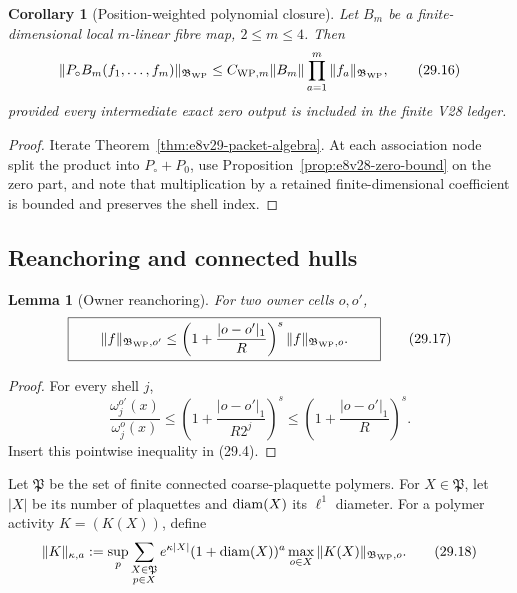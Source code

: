 \documentclass[11pt,oneside]{book}
\newtheorem{lemma}[theorem]{Lemma}
\newtheorem{corollary}[theorem]{Corollary}
\theoremstyle{definition}
\theoremstyle{remark}
\begin{document}
\begin{corollary}[Position-weighted polynomial closure]
\label{cor:e8v29-polynomial}
Let \(B_m\) be a finite-dimensional local \(m\)-linear fibre map,
\(2\leq m\leq4\).  Then
\[
 \|P_\circ B_m(f_1,\ldots,f_m)\|_{\mathfrak B_{\rm WP}}
 \leq C_{{\rm WP},m}\|B_m\|
       \prod_{a=1}^m\|f_a\|_{\mathfrak B_{\rm WP}},               \tag{29.16}
\]
provided every intermediate exact zero output is included in the
finite V28 ledger.
\end{corollary}

\begin{proof}
Iterate Theorem~\ref{thm:e8v29-packet-algebra}.  At each association
node split the product into \(P_\circ+P_0\), use
Proposition~\ref{prop:e8v28-zero-bound} on the zero part, and note
that multiplication by a retained finite-dimensional coefficient is
bounded and preserves the shell index.
\end{proof}

\subsection{Reanchoring and connected hulls}

\begin{lemma}[Owner reanchoring]
\label{lem:e8v29-reanchor}
For two owner cells \(o,o'\),
\[
\boxed{\qquad
 \|f\|_{\mathfrak B_{\rm WP},o'}
 \leq
 \left(1+\frac{|o-o'|_1}{R}\right)^s
 \|f\|_{\mathfrak B_{\rm WP},o}.
\qquad}                                                           \tag{29.17}
\]
\end{lemma}

\begin{proof}
For every shell \(j\),
\[
 \frac{\omega_j^{o'}(x)}{\omega_j^o(x)}
 \leq
 \left(1+\frac{|o-o'|_1}{R2^j}\right)^s
 \leq
 \left(1+\frac{|o-o'|_1}{R}\right)^s.
\]
Insert this pointwise inequality in (29.4).
\end{proof}

Let \({\mathfrak P}\) be the set of finite connected coarse-plaquette
polymers.  For \(X\in{\mathfrak P}\), let \(|X|\) be its number of
plaquettes and \({\rm diam}(X)\) its \(\ell^1\) diameter.  For a
polymer activity \(K=(K(X))\), define
\[
\begin{split}
 \|K\|_{\kappa,a}:=
 \sup_p\sum_{\substack{X\in{\mathfrak P}\\p\in X}}
 e^{\kappa|X|}(1+{\rm diam}(X))^a
 \max_{o\in X}\|K(X)\|_{\mathfrak B_{\rm WP},o}.                  \tag{29.18}
\end{split}
\]
\end{document}
